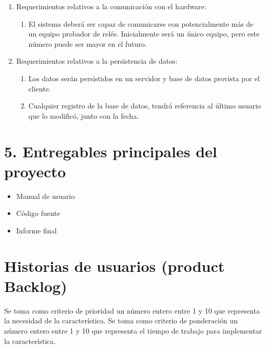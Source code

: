 \documentclass[11pt]{charter}
\begin{document}
\begin{enumerate}
\item Requerimientos relativos a la comunicación con el hardware:
	\begin{enumerate}
	\item El sistema deberá ser capaz de comunicarse con potencialmente más de un equipo probador de relés. Inicialmente será un único equipo, pero este número puede ser mayor en el futuro.
	\end{enumerate}

\item Requerimientos relativos a la persistencia de datos:
	\begin{enumerate}
	\item Los datos serán persistidos en un servidor y base de datos provista por el cliente.
	\item Cualquier registro de la base de datos, tendrá referencia al último usuario que lo modificó, junto con la fecha.
	\end{enumerate}

	
\end{enumerate}

\section{5. Entregables principales del proyecto}
\label{sec:entregables}

\begin{itemize}
\item Manual de usuario
\item Código fuente
\item Informe final
\end{itemize}


\section{Historias de usuarios (product Backlog)}

Se toma como criterio de prioridad un número entero entre 1 y 10 que representa la necesidad de la característica. Se toma como criterio de ponderación un número entero entre 1 y 10 que representa el tiempo de trabajo para implementar la característica.
\end{document}
